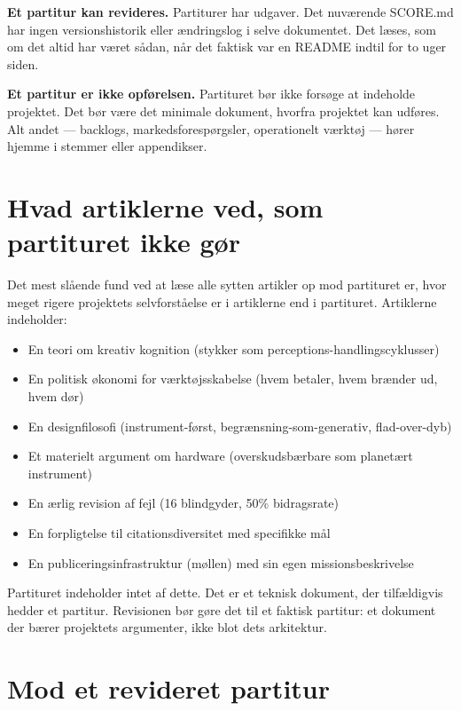 \documentclass[10pt,letterpaper,twocolumn]{article}
\begin{document}
\textbf{Et partitur kan revideres.} Partiturer har udgaver. Det nuv\ae rende SCORE.md har ingen versionshistorik eller \ae ndringslog i selve dokumentet. Det l\ae ses, som om det altid har v\ae ret s\aa dan, n\aa r det faktisk var en README indtil for to uger siden.

\textbf{Et partitur er ikke opf\o relsen.} Partituret b\o r ikke fors\o ge at indeholde projektet. Det b\o r v\ae re det minimale dokument, hvorfra projektet kan udf\o res. Alt andet --- backlogs, markedsforesp\o rgsler, operationelt v\ae rkt\o j --- h\o rer hjemme i stemmer eller appendikser.

\section{Hvad artiklerne ved, som partituret ikke g\o r}

Det mest sl\aa ende fund ved at l\ae se alle sytten artikler op mod partituret er, hvor meget rigere projektets selvforst\aa else er i artiklerne end i partituret. Artiklerne indeholder:

\begin{itemize}
\item En teori om kreativ kognition (stykker som perceptions-handlingscyklusser)
\item En politisk \o konomi for v\ae rkt\o jsskabelse (hvem betaler, hvem br\ae nder ud, hvem d\o r)
\item En designfilosofi (instrument-f\o rst, begr\ae nsning-som-generativ, flad-over-dyb)
\item Et materielt argument om hardware (overskudsb\ae rbare som planet\ae rt instrument)
\item En \ae rlig revision af fejl (16 blindgyder, 50\% bidragsrate)
\item En forpligtelse til citationsdiversitet med specifikke m\aa l
\item En publiceringsinfrastruktur (m\o llen) med sin egen missionsbeskrivelse
\end{itemize}

Partituret indeholder intet af dette. Det er et teknisk dokument, der tilf\ae ldigvis hedder et partitur. Revisionen b\o r g\o re det til et faktisk partitur: et dokument der b\ae rer projektets argumenter, ikke blot dets arkitektur.

\section{Mod et revideret partitur}
\end{document}
